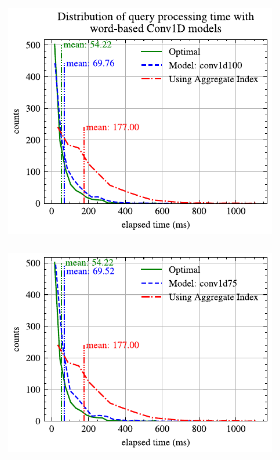 \begin{figure}[!h]
	\centering
	\begin{subfigure}{0.45\textwidth}
		\begin{subfigure}{\textwidth}
			\centering
			\includegraphics[]{my/graphics/perf_dist_conv1d100_B.pdf}
		\end{subfigure}
		\vfill
		\begin{subfigure}{\textwidth}
			\centering
			\includegraphics[]{my/graphics/perf_dist_conv1d75_B.pdf}
		\end{subfigure}
		\vfill
		\begin{subfigure}{\textwidth}
			\centering

\end{subfigure}
\end{subfigure}
\end{figure}
